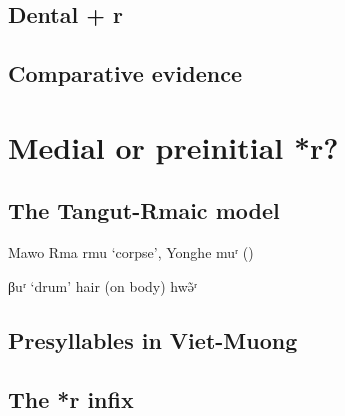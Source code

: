 \documentclass[oldfontcommands,oneside,a4paper,11pt]{article}
\newcommand{\ipa}[1]{{\phon \mbox{#1}}} %
\begin{document}
\citet{nikitina12logophoric}

\subsection{Dental + r}

%

\subsection{Comparative evidence}

\section{Medial or preinitial *r?}

\subsection{The Tangut-Rmaic model}
 
 Mawo Rma \ipa{rmu} `corpse', Yonghe \ipa{muʳ} (\citealt[41]{sims14yonghe})

\ipa{βuʳ} `drum'
hair (on body) \ipa{hwə̃ʳ}
\subsection{Presyllables in Viet-Muong}

\subsection{The *r infix}

 \citet{sagart99roc}
\end{document}
